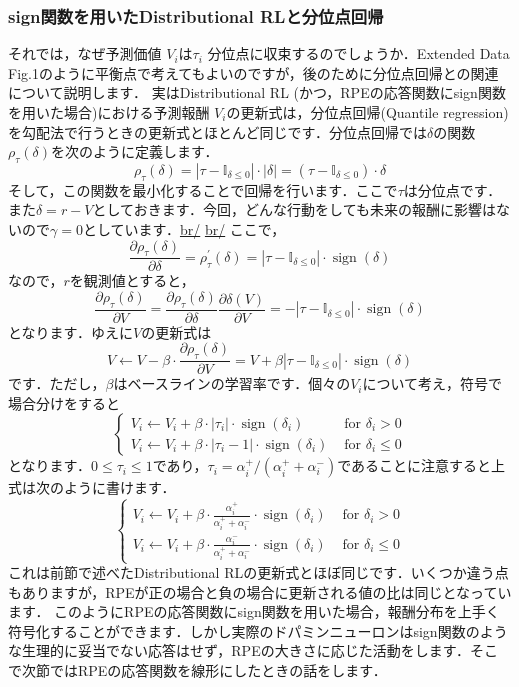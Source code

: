 \subsubsection{sign関数を用いたDistributional RLと分位点回帰}それでは，なぜ予測価値 $V_i$は$\tau_i$ 分位点に収束するのでしょうか．Extended Data Fig.1のように平衡点で考えてもよいのですが，後のために分位点回帰との関連について説明します．
実はDistributional RL (かつ，RPEの応答関数にsign関数を用いた場合)における予測報酬 $V_i$の更新式は，分位点回帰(Quantile
regression)を勾配法で行うときの更新式とほとんど同じです．分位点回帰では$\delta$の関数$\rho_{\tau}(\delta)$を次のように定義します． $$ \rho_{\tau}(\delta)=\left|\tau-\mathbb{I}_{\delta \leq 0}\right|\cdot |\delta|=\left(\tau-\mathbb{I}_{\delta
\leq 0}\right)\cdot \delta $$ そして，この関数を最小化することで回帰を行います．ここで$\tau$は分位点です．また$\delta=r-V$としておきます．今回，どんな行動をしても未来の報酬に影響はないので$\gamma=0$としています．\url{br/}
\url{br/}
ここで， $$ \frac{\partial \rho_{\tau}(\delta)}{\partial \delta}=\rho_{\tau}^{\prime}(\delta)=\left|\tau-\mathbb{I}_{\delta \leq 0}\right| \cdot \operatorname{sign}(\delta) $$ なので，$r$を観測値とすると， $$
\frac{\partial \rho_{\tau}(\delta)}{\partial V}=\frac{\partial \rho_{\tau}(\delta)}{\partial \delta}\frac{\partial \delta(V)}{\partial V}=-\left|\tau-\mathbb{I}_{\delta \leq 0}\right| \cdot
\operatorname{sign}(\delta) $$ となります．ゆえに$V$の更新式は $$ V \leftarrow V - \beta\cdot\frac{\partial \rho_{\tau}(\delta)}{\partial V}=V+\beta \left|\tau-\mathbb{I}_{\delta \leq 0}\right| \cdot
\operatorname{sign}(\delta) $$ です．ただし，$\beta$はベースラインの学習率です．個々の$V_i$について考え，符号で場合分けをすると
$$ \begin{cases} V_{i} \leftarrow V_{i}+\beta\cdot |\tau_i|\cdot\operatorname{sign}\left(\delta_{i}\right)
&\text { for } \delta_{i}>0\\ V_{i} \leftarrow V_{i}+\beta\cdot |\tau_i-1|\cdot\operatorname{sign}\left(\delta_{i}\right) &\text { for } \delta_{i} \leq 0 \end{cases} $$ となります．$0 \leq
\tau_i \leq 1$であり，$\tau_i=\alpha_{i}^{+} / \left(\alpha_{i}^{+} + \alpha_{i}^{-}\right)$であることに注意すると上式は次のように書けます． $$ \begin{cases} V_{i} \leftarrow V_{i}+\beta\cdot
\frac{\alpha_{i}^{+}}{\alpha_{i}^{+}+\alpha_{i}^{-}}\cdot\operatorname{sign}\left(\delta_{i}\right) &\text { for } \delta_{i}>0\\ V_{i} \leftarrow V_{i}+\beta\cdot
\frac{\alpha_{i}^{-}}{\alpha_{i}^{+}+\alpha_{i}^{-}}\cdot\operatorname{sign}\left(\delta_{i}\right) &\text { for } \delta_{i} \leq 0 \end{cases} $$ これは前節で述べたDistributional
RLの更新式とほぼ同じです．いくつか違う点もありますが，RPEが正の場合と負の場合に更新される値の比は同じとなっています．
このようにRPEの応答関数にsign関数を用いた場合，報酬分布を上手く符号化することができます．しかし実際のドパミンニューロンはsign関数のような生理的に妥当でない応答はせず，RPEの大きさに応じた活動をします．そこで次節ではRPEの応答関数を線形にしたときの話をします．